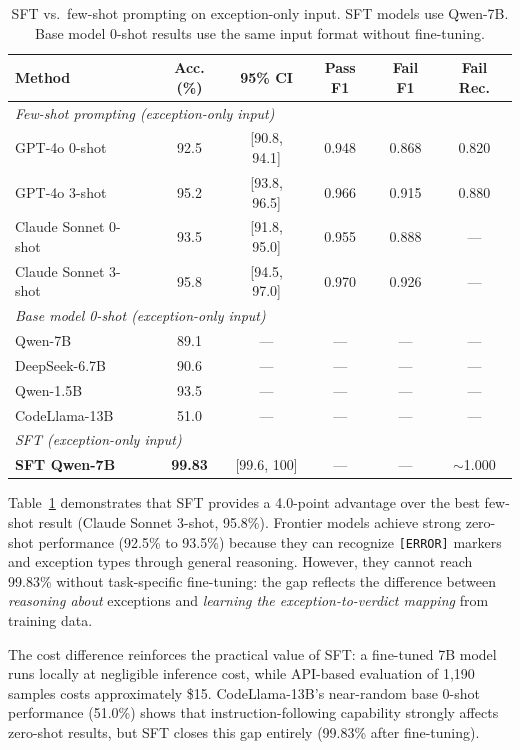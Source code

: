 \documentclass[11pt]{article}
\begin{document}
\begin{table}[t]
\centering
\caption{SFT vs.\ few-shot prompting on exception-only input. SFT models use Qwen-7B. Base model 0-shot results use the same input format without fine-tuning.}
\label{tab:fewshot}
\small
\begin{tabular}{lccccc}
\toprule
\textbf{Method} & \textbf{Acc. (\%)} & \textbf{95\% CI} & \textbf{Pass F1} & \textbf{Fail F1} & \textbf{Fail Rec.} \\
\midrule
\multicolumn{6}{l}{\textit{Few-shot prompting (exception-only input)}} \\
GPT-4o 0-shot & 92.5 & [90.8, 94.1] & 0.948 & 0.868 & 0.820 \\
GPT-4o 3-shot & 95.2 & [93.8, 96.5] & 0.966 & 0.915 & 0.880 \\
Claude Sonnet 0-shot & 93.5 & [91.8, 95.0] & 0.955 & 0.888 & --- \\
Claude Sonnet 3-shot & 95.8 & [94.5, 97.0] & 0.970 & 0.926 & --- \\
\midrule
\multicolumn{6}{l}{\textit{Base model 0-shot (exception-only input)}} \\
Qwen-7B & 89.1 & --- & --- & --- & --- \\
DeepSeek-6.7B & 90.6 & --- & --- & --- & --- \\
Qwen-1.5B & 93.5 & --- & --- & --- & --- \\
CodeLlama-13B & 51.0 & --- & --- & --- & --- \\
\midrule
\multicolumn{6}{l}{\textit{SFT (exception-only input)}} \\
\textbf{SFT Qwen-7B} & \textbf{99.83} & [99.6, 100] & --- & --- & $\sim$1.000 \\
\bottomrule
\end{tabular}
\end{table}

Table~\ref{tab:fewshot} demonstrates that SFT provides a 4.0-point advantage over the best few-shot result (Claude Sonnet 3-shot, 95.8\%). Frontier models achieve strong zero-shot performance (92.5\% to 93.5\%) because they can recognize \texttt{[ERROR]} markers and exception types through general reasoning. However, they cannot reach 99.83\% without task-specific fine-tuning: the gap reflects the difference between \emph{reasoning about} exceptions and \emph{learning the exception-to-verdict mapping} from training data.

The cost difference reinforces the practical value of SFT: a fine-tuned 7B model runs locally at negligible inference cost, while API-based evaluation of 1,190 samples costs approximately \$15. CodeLlama-13B's near-random base 0-shot performance (51.0\%) shows that instruction-following capability strongly affects zero-shot results, but SFT closes this gap entirely (99.83\% after fine-tuning).
\end{document}
